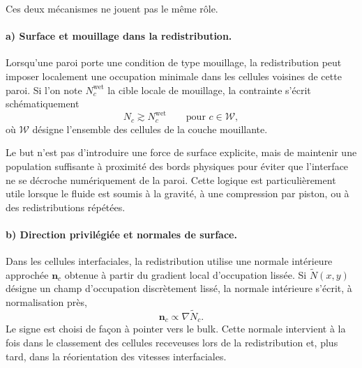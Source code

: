 \documentclass[11pt,a4paper]{article}
\begin{document}
Ces deux mécanismes ne jouent pas le même rôle.

\paragraph{a) Surface et mouillage dans la redistribution.}
Lorsqu'une paroi porte une condition de type mouillage, la redistribution peut imposer localement une occupation minimale dans les cellules voisines de cette paroi. Si l'on note $N_c^{\mathrm{wet}}$ la cible locale de mouillage, la contrainte s'écrit schématiquement
\begin{equation}
  N_c \gtrsim N_c^{\mathrm{wet}}
  \qquad \text{pour } c \in \mathcal{W},
\end{equation}
où $\mathcal{W}$ désigne l'ensemble des cellules de la couche mouillante.

Le but n'est pas d'introduire une force de surface explicite, mais de maintenir une population suffisante à proximité des bords physiques pour éviter que l'interface ne se décroche numériquement de la paroi. Cette logique est particulièrement utile lorsque le fluide est soumis à la gravité, à une compression par piston, ou à des redistributions répétées.

\paragraph{b) Direction privilégiée et normales de surface.}
Dans les cellules interfaciales, la redistribution utilise une normale intérieure approchée $\bm{n}_c$ obtenue à partir du gradient local d'occupation lissée. Si $\widetilde{N}(x,y)$ désigne un champ d'occupation discrètement lissé, la normale intérieure s'écrit, à normalisation près,
\begin{equation}
  \bm{n}_c \propto \nabla \widetilde{N}_c.
\end{equation}
Le signe est choisi de façon à pointer vers le bulk. Cette normale intervient à la fois dans le classement des cellules receveuses lors de la redistribution et, plus tard, dans la réorientation des vitesses interfaciales.
\end{document}
